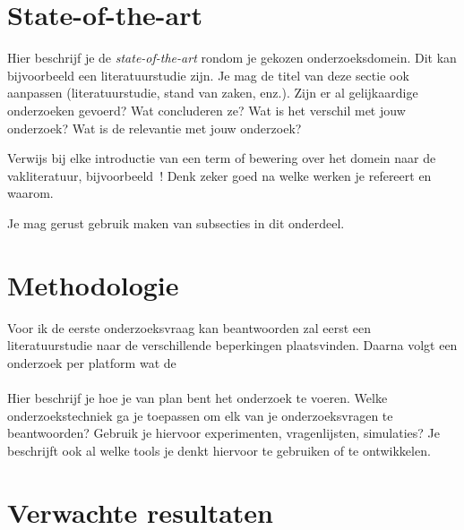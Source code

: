 
\section{State-of-the-art}
\label{sec:state-of-the-art}

Hier beschrijf je de \emph{state-of-the-art} rondom je gekozen onderzoeksdomein. Dit kan bijvoorbeeld een literatuurstudie zijn. Je mag de titel van deze sectie ook aanpassen (literatuurstudie, stand van zaken, enz.). Zijn er al gelijkaardige onderzoeken gevoerd? Wat concluderen ze? Wat is het verschil met jouw onderzoek? Wat is de relevantie met jouw onderzoek?

Verwijs bij elke introductie van een term of bewering over het domein naar de vakliteratuur, bijvoorbeeld~\autocite{Doll1954}! Denk zeker goed na welke werken je refereert en waarom.


Je mag gerust gebruik maken van subsecties in dit onderdeel.

\section{Methodologie}
\label{sec:methodologie}

Voor ik de eerste onderzoeksvraag kan beantwoorden zal eerst een literatuurstudie naar de verschillende beperkingen plaatsvinden. Daarna volgt een onderzoek per platform wat de \\~\\

Hier beschrijf je hoe je van plan bent het onderzoek te voeren. Welke onderzoekstechniek ga je toepassen om elk van je onderzoeksvragen te beantwoorden? Gebruik je hiervoor experimenten, vragenlijsten, simulaties? Je beschrijft ook al welke tools je denkt hiervoor te gebruiken of te ontwikkelen.

\section{Verwachte resultaten}
\label{sec:verwachte_resultaten}

